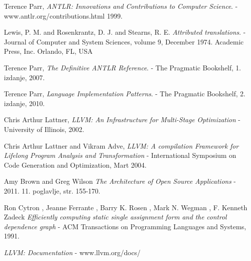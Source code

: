 \begin{thebibliography}{9}

   
	Terence Parr,
	\emph{ANTLR: Innovations and Contributions to Computer Science}.
	- www.antlr.org/contributions.html
	1999.

	Lewis, P. M. and Rosenkrantz, D. J. and Stearns, R. E.
	\emph{Attributed translations}.
	- Journal of Computer and System Sciences, 
	volume 9,
	December 1974.
	Academic Press, Inc. Orlando, FL, USA

	Terence Parr,
	\emph{The Definitive ANTLR Reference}.
	- The Pragmatic Bookshelf,
	1. izdanje,
	2007.

	Terence Parr,
	\emph{Language Implementation Patterns}.
	- The Pragmatic Bookshelf,
	2. izdanje,
	2010.

	Chris Arthur Lattner,
	\emph{LLVM: An Infrastructure for Multi-Stage Optimization}
	- University of Illinois, 2002.
	
	Chris Arthur Lattner and Vikram Adve,
	\emph{LLVM: A compilation Framework for Lifelong Program Analysis and Transformation}
	- International Symposium on Code Generation and Optimization, Mart 2004.
	
	Amy Brown and Greg Wilson
	\emph{The Architecture of Open Source Applications}
	- 2011. 11. poglavlje, str. 155-170. 

	Ron Cytron , Jeanne Ferrante , Barry K. Rosen , Mark N. Wegman , F. Kenneth Zadeck
	\emph{Efficiently computing static single assignment form and the control dependence graph}
	- ACM Transactions on Programming Languages and Systems, 1991. 


	\emph{LLVM: Documentation}
	- www.llvm.org/docs/

\end{thebibliography}